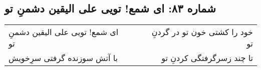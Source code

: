 \begin{center}
\section*{شماره ۸۳: ای شمع! تویی علی الیقین دشمنِ تو}
\label{sec:083}
\begin{longtable}{l p{0.5cm} r}
ای شمع! تویی علی الیقین دشمنِ تو
&&
خود را کشتی خون تو در گردنِ تو
\\
با آتش سوزنده گرفتی سرِخویش
&&
تا چند زسرگرفتگی کردنِ تو
\\
\end{longtable}
\end{center}
